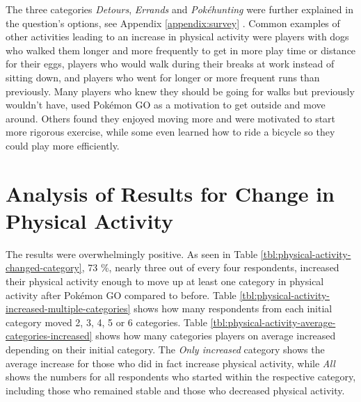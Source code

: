 The three categories \emph{Detours}, \emph{Errands} and \emph{Pokéhunting} were further explained in the question's options, see Appendix \ref{appendix:survey} . Common examples of other activities leading to an increase in physical activity were players with dogs who walked them longer and more frequently to get in more play time or distance for their eggs, players who would walk during their breaks at work instead of sitting down, and players who went for longer or more frequent runs than previously. Many players who knew they should be going for walks but previously wouldn't have, used Pokémon GO as a motivation to get outside and move around. Others found they enjoyed moving more and were motivated to start more rigorous exercise, while some even learned how to ride a bicycle so they could play more efficiently. 

\section{Analysis of Results for Change in Physical Activity}

The results were overwhelmingly positive. As seen in Table \ref{tbl:physical-activity-changed-category}, 73 \%, nearly three out of every four respondents, increased their physical activity enough to move up at least one category in physical activity after Pokémon GO compared to before. Table \ref{tbl:physical-activity-increased-multiple-categories} shows how many respondents from each initial category moved 2, 3, 4, 5 or 6 categories. Table \ref{tbl:physical-activity-average-categories-increased} shows how many categories players on average increased depending on their initial category. The \emph{Only increased} category shows the average increase for those who did in fact increase physical activity, while \emph{All} shows the numbers for all respondents who started within the respective category, including those who remained stable and those who decreased physical activity. 

